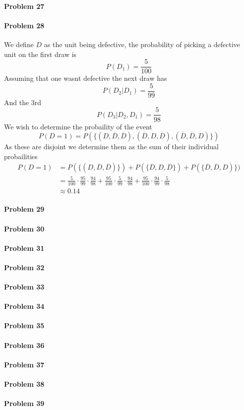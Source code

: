 \paragraph{Problem 27}
\paragraph{Problem 28}
We define $D$ as the unit being defective, the probability of picking a defective unit on the first draw is
\[
    P(D_1)=\frac{5}{100}
\]
Assuming that one wasnt defective the next draw has
\[
    P(D_2|D_1)=\frac{5}{99}
\]
And the 3rd
\[
    P(D_3|D_2,D_1)=\frac{5}{98}
\]
We wish to determine the probaility of the event
\[
    P(D=1)=P(\{(D,\overline{D},\overline{D}),(\overline{D},D,\overline{D}),(\overline{D},\overline{D},D)\})
\]
As these are disjoint we determine them as the sum of their individual probailities
\begin{align*}
P(D=1)&=P(\{(D,\overline{D},\overline{D})\})+P(\{\overline{D},D,\overline{D}\})+P(\{\overline{D},\overline{D},D)\}) \\
      &=\frac{5}{100}\cdot\frac{95}{99}\cdot\frac{94}{98}+\frac{95}{100}\cdot\frac{5}{99}\cdot\frac{94}{98}+\frac{95}{100}\cdot\frac{94}{99}\cdot\frac{5}{98} \\
      &\approx 0.14
\end{align*}
\paragraph{Problem 29}
\paragraph{Problem 30}
\paragraph{Problem 31}
\paragraph{Problem 32}
\paragraph{Problem 33}
\paragraph{Problem 34}
\paragraph{Problem 35}
\paragraph{Problem 36}
\paragraph{Problem 37}
\paragraph{Problem 38}
\paragraph{Problem 39}

